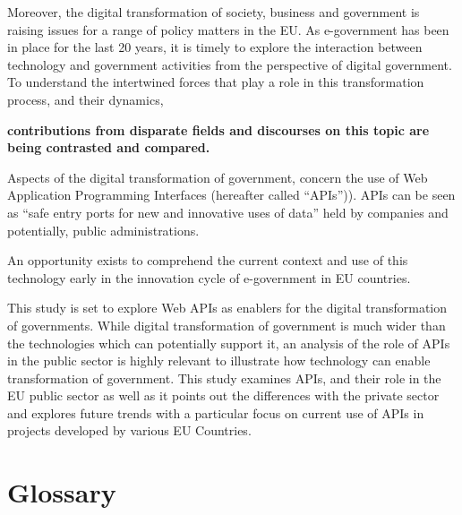 Moreover, the digital transformation of society, business and government is raising
issues for a range of policy matters in the EU. As e-government has
been in place for the last 20 years, it is timely to explore the interaction between
technology and government activities from the perspective of digital government.
To understand the intertwined forces that play a role in this transformation process,
and their dynamics, 

\textbf{contributions from disparate fields and discourses on this topic
are being contrasted and compared.}

Aspects of the digital
transformation of government, concern the use of Web Application Programming Interfaces
(hereafter called “APIs”)). APIs can be seen as “safe entry ports for new and
innovative uses of data” held by companies and potentially, public administrations.

An opportunity exists to comprehend the current context and use of this technology
early in the innovation cycle of e-government in EU countries.

This study is set to explore
Web APIs as enablers for the digital transformation of governments. While
digital transformation of government is much wider than the technologies which
can potentially support it, an analysis of the role of APIs in the public sector
is highly relevant to illustrate how technology can enable transformation of
government. This study examines APIs, and their role in the EU public sector as
well as it points out the differences with the private sector and explores future
trends with a particular focus on current use of APIs in projects developed by various
EU Countries.

\clearpage

\section{Glossary} %

